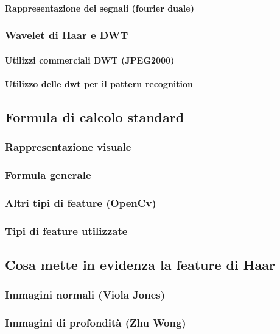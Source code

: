                 \paragraph{Rappresentazione dei segnali (fourier duale)}
            \subsubsection{Wavelet di Haar e DWT}
                \paragraph{Utilizzi commerciali DWT (JPEG2000)}
                \paragraph{Utilizzo delle dwt per il pattern recognition}
        \subsection{Formula di calcolo standard}
            \subsubsection{Rappresentazione visuale}
            \subsubsection{Formula generale}
            \subsubsection{Altri tipi di feature (OpenCv)}
            \subsubsection{Tipi di feature utilizzate}
        \subsection{Cosa mette in evidenza la feature di Haar}
            \subsubsection{Immagini normali (Viola Jones)}
            \subsubsection{Immagini di profondità (Zhu Wong)}
